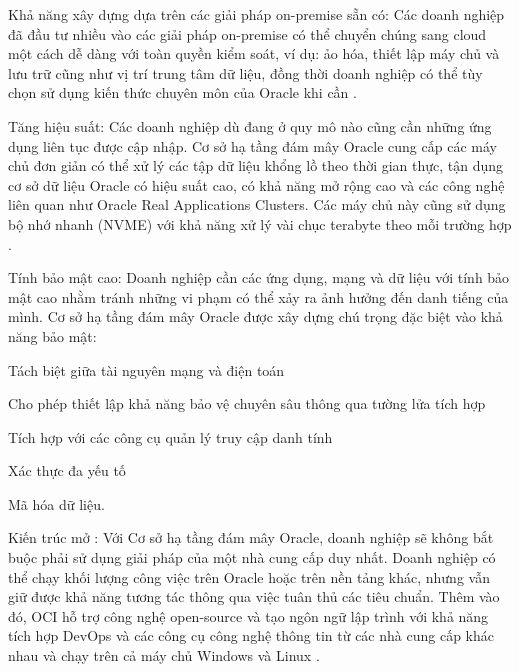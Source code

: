 \begin{myitem}
    \item Khả năng xây dựng dựa trên các giải pháp on-premise sẵn có: Các doanh nghiệp đã đầu tư nhiều vào các giải pháp on-premise có thể chuyển chúng sang cloud một cách dễ dàng với toàn quyền kiểm soát, ví dụ: ảo hóa, thiết lập máy chủ và lưu trữ cũng như vị trí trung tâm dữ liệu, đồng thời doanh nghiệp có thể tùy chọn sử dụng kiến thức chuyên môn của Oracle khi cần \cite{gimasys_oci_benefits}.

    \item Tăng hiệu suất: Các doanh nghiệp dù đang ở quy mô nào cũng cần những ứng dụng liên tục được cập nhập. Cơ sở hạ tầng đám mây Oracle cung cấp các máy chủ đơn giản có thể xử lý các tập dữ liệu khổng lồ theo thời gian thực, tận dụng cơ sở dữ liệu Oracle có hiệu suất cao, có khả năng mở rộng cao và các công nghệ liên quan như Oracle Real Applications Clusters. Các máy chủ này cũng sử dụng bộ nhớ nhanh (NVME) với khả năng xử lý vài chục terabyte theo mỗi trường hợp \cite{gimasys_oci_benefits}.

    \item Tính bảo mật cao: Doanh nghiệp cần các ứng dụng, mạng và dữ liệu với tính bảo mật cao nhằm tránh những vi phạm có thể xảy ra ảnh hưởng đến danh tiếng của mình. Cơ sở hạ tầng đám mây Oracle được xây dựng chú trọng đặc biệt vào khả năng bảo mật:

    \begin{mysubitem}
        \item Tách biệt giữa tài nguyên mạng và điện toán

        \item Cho phép thiết lập khả năng bảo vệ chuyên sâu thông qua tường lửa tích hợp 
        
        \item Tích hợp với các công cụ quản lý truy cập danh tính

        \item Xác thực đa yếu tố 
        
        \item Mã hóa dữ liệu.

    \end{mysubitem}

    \item Kiến trúc mở : Với Cơ sở hạ tầng đám mây Oracle, doanh nghiệp sẽ không bắt buộc phải sử dụng giải pháp của một nhà cung cấp duy nhất. Doanh nghiệp có thể chạy khối lượng công việc trên Oracle hoặc trên nền tảng khác, nhưng vẫn giữ được khả năng tương tác thông qua việc tuân thủ các tiêu chuẩn. Thêm vào đó, OCI hỗ trợ công nghệ open-source và tạo ngôn ngữ lập trình với khả năng tích hợp DevOps và các công cụ công nghệ thông tin từ các nhà cung cấp khác nhau và chạy trên cả máy chủ Windows và Linux \cite{gimasys_oci_benefits}.
\end{myitem}

